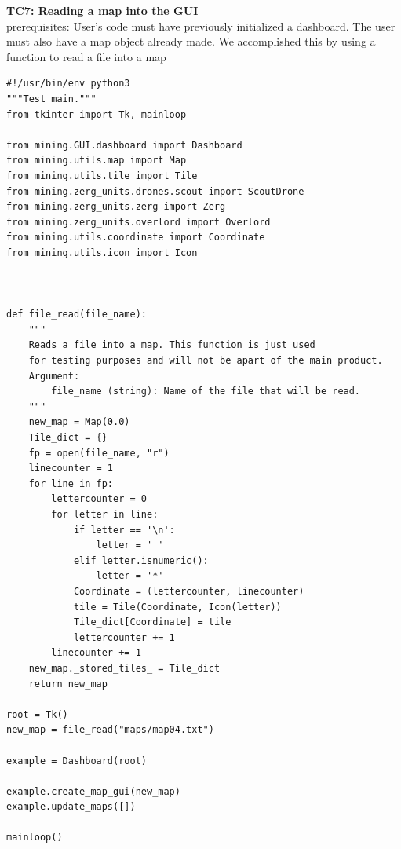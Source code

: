 \documentclass{article}
\begin{document}
\newpage
\Large\textbf{TC7: Reading a map into the GUI}\\
\indent\large{prerequisites: User's code must have previously initialized a dashboard. The user must also have a map object already made. We accomplished this by using a function to 
read a file into a map}\\
\begin{lstlisting}
#!/usr/bin/env python3
"""Test main."""
from tkinter import Tk, mainloop

from mining.GUI.dashboard import Dashboard
from mining.utils.map import Map
from mining.utils.tile import Tile
from mining.zerg_units.drones.scout import ScoutDrone
from mining.zerg_units.zerg import Zerg
from mining.zerg_units.overlord import Overlord
from mining.utils.coordinate import Coordinate
from mining.utils.icon import Icon



def file_read(file_name):
    """
    Reads a file into a map. This function is just used
    for testing purposes and will not be apart of the main product.
    Argument:
        file_name (string): Name of the file that will be read.
    """
    new_map = Map(0.0)
    Tile_dict = {}
    fp = open(file_name, "r")
    linecounter = 1
    for line in fp:
        lettercounter = 0 
        for letter in line:
            if letter == '\n':
                letter = ' '
            elif letter.isnumeric():
                letter = '*'
            Coordinate = (lettercounter, linecounter)
            tile = Tile(Coordinate, Icon(letter))
            Tile_dict[Coordinate] = tile
            lettercounter += 1
        linecounter += 1
    new_map._stored_tiles_ = Tile_dict
    return new_map

root = Tk()
new_map = file_read("maps/map04.txt")

example = Dashboard(root)

example.create_map_gui(new_map)
example.update_maps([])

mainloop()

\end{lstlisting}
\end{document}
